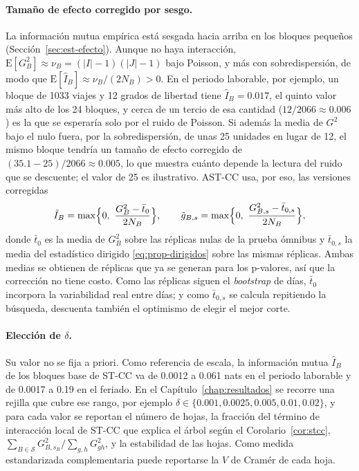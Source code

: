 \paragraph{Tamaño de efecto corregido por sesgo.} La información mutua empírica
está sesgada hacia arriba en los bloques pequeños
(Sección~\ref{sec:est-efecto}). Aunque no haya interacción,
$\mathrm{E}[G^2_B]\approx\nu_B = (|I|-1)(|J|-1)$ bajo Poisson, y más con
sobredispersión, de modo que $\mathrm{E}[\hat I_B]\approx \nu_B/(2N_B) > 0$. En el
periodo laborable, por ejemplo, un bloque de 1033 viajes y 12 grados de
libertad tiene $\hat I_B = 0.017$, el quinto valor más alto de los 24 bloques,
y cerca de un tercio de esa cantidad ($12/2066\approx 0.006$) es la que se
esperaría solo por el ruido de Poisson. Si además la media de $G^2$ bajo el nulo
fuera, por la sobredispersión, de unas 25 unidades en lugar de 12, el mismo
bloque tendría un tamaño de efecto corregido de $(35.1-25)/2066\approx 0.005$, lo
que muestra cuánto depende la lectura del ruido que se descuente; el valor de 25 es
ilustrativo. AST-CC usa, por eso, las versiones
corregidas
\begin{equation}\label{eq:prop-efecto-corregido}
  \tilde I_B = \max\Bigl\{0,\ \frac{G^2_B - \bar t_0}{2N_B}\Bigr\},
  \qquad
  \tilde g_{B,s} = \max\Bigl\{0,\ \frac{G^2_{B,s} - \bar t_{0,s}}{2N_B}\Bigr\},
\end{equation}
donde $\bar t_0$ es la media de $G^2_B$ sobre las réplicas nulas de la prueba
ómnibus y $\bar t_{0,s}$ la media del estadístico dirigido
\eqref{eq:prop-dirigidos} sobre las mismas réplicas. Ambas medias se obtienen de
réplicas que ya se generan para los p-valores, así que la corrección no tiene
costo. Como las réplicas siguen el \emph{bootstrap} de días, $\bar t_0$ incorpora la
variabilidad real entre días; y como $\bar t_{0,s}$ se calcula repitiendo la
búsqueda, descuenta también el optimismo de elegir el mejor corte.

\paragraph{Elección de $\delta$.} Su valor no se fija a priori. Como referencia
de escala, la información mutua $\hat I_B$ de los bloques base de ST-CC va de
0.0012 a 0.061 nats en el periodo laborable y de 0.0017 a 0.19 en el feriado.
En el Capítulo~\ref{chap:resultados} se recorre una rejilla que cubre ese rango,
por ejemplo $\delta\in\{0.001, 0.0025, 0.005, 0.01, 0.02\}$, y para cada valor
se reportan el número de hojas, la fracción del término de interacción local de
ST-CC que explica el árbol según el Corolario~\ref{cor:stcc},
$\sum_{B\in\mathcal{S}}G^2_{B,s_B}\big/\sum_{g,h}G^2_{gh}$, y la estabilidad de
las hojas. Como medida estandarizada complementaria puede reportarse la $V$ de
Cramér de cada hoja.

